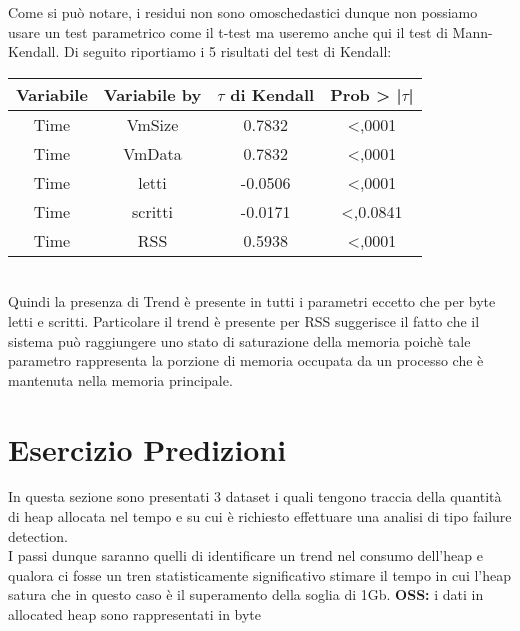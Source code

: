Come si può notare, i residui non sono omoschedastici
dunque non possiamo usare un test parametrico come il t-test ma useremo anche qui il test di Mann-Kendall.
Di seguito riportiamo i 5 risultati del test di Kendall:
\begin{table}[htbp]
    \centering
    \label{tab:esempio}
    \begin{tabular}{|c|c|c|c|} %
        \hline
        Variabile & Variabile by & $\tau$ di Kendall &Prob > |$\tau$| \\ %
        \hline
        Time & VmSize & 0.7832 & <,0001\\
        Time & VmData & 0.7832 & <,0001\\
        Time & letti & -0.0506 & <,0001\\
        Time & scritti & -0.0171 & <,0.0841\\
        Time & RSS & 0.5938 & <,0001\\
        \hline
    \end{tabular}
\end{table}
\\
Quindi la presenza di Trend è presente in tutti i parametri eccetto che per byte letti e scritti. Particolare il trend è presente per RSS suggerisce il fatto che il sistema
può raggiungere uno stato di saturazione della memoria poichè tale parametro rappresenta la porzione di memoria occupata da un processo
che è mantenuta nella memoria principale.
\section{Esercizio Predizioni}
In questa sezione sono presentati 3 dataset i quali tengono traccia della quantità di heap allocata nel tempo e su cui è richiesto effettuare una analisi di tipo failure detection.\\
I passi dunque saranno quelli di identificare un trend nel consumo dell'heap e qualora ci fosse un tren statisticamente significativo stimare il tempo in cui l'heap satura che in questo caso è il superamento della soglia di 1Gb.
\textbf{OSS:} i dati in allocated heap sono rappresentati in byte
